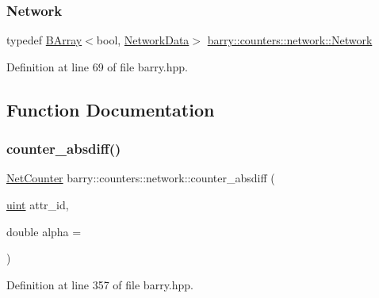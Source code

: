 \subsubsection{\texorpdfstring{Network}{Network}}
{\footnotesize\ttfamily typedef \hyperlink{classbarry_1_1_b_array}{B\+Array}$<$bool, \hyperlink{classbarry_1_1counters_1_1network_1_1_network_data}{Network\+Data}$>$ \hyperlink{namespacebarry_1_1counters_1_1network_a4cb88d4572ded3b447ea269c9cd0b2c0}{barry\+::counters\+::network\+::\+Network}}



Definition at line 69 of file barry.\+hpp.



\subsection{Function Documentation}
\mbox{\label{namespacebarry_1_1counters_1_1network_a03bd4bb3270e9386dfaefcae818f216a}} 
\subsubsection{\texorpdfstring{counter\+\_\+absdiff()}{counter\_absdiff()}}
{\footnotesize\ttfamily \hyperlink{namespacebarry_1_1counters_1_1network_a067bd9de04608fc2e1586324d3864a45}{Net\+Counter} barry\+::counters\+::network\+::counter\+\_\+absdiff (\begin{DoxyParamCaption}\item[{\hyperlink{namespacebarry_a11dfc53ddb4672278319aa04f1e09a6c}{uint}}]{attr\+\_\+id,  }\item[{double}]{alpha = {} }\end{DoxyParamCaption})\hspace{0.3cm}{\ttfamily [inline]}}



Definition at line 357 of file barry.\+hpp.

\mbox{\label{namespacebarry_1_1counters_1_1network_a46633354cf1e81a1fe19eba64456ca75}} 
